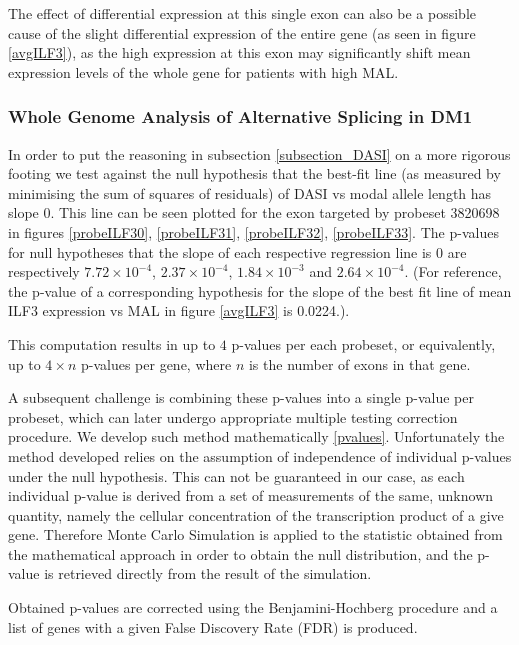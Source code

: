 The effect of differential expression at this single exon can also be a possible cause of the slight differential expression of the entire gene (as seen in figure \ref{avgILF3}), as the high expression at this exon may significantly shift mean expression levels of the whole gene for patients with high MAL.

\subsubsection{Whole Genome Analysis of Alternative Splicing in DM1} \label{section_wholegenome}

In order to put the reasoning in subsection \ref{subsection_DASI} on a more rigorous footing we test against the null hypothesis that the best-fit line (as measured by minimising the sum of squares of residuals) of DASI vs modal allele length has slope 0. This line can be seen plotted for the exon targeted by probeset 3820698 in figures \ref{probeILF30}, \ref{probeILF31}, \ref{probeILF32}, \ref{probeILF33}. The p-values for null hypotheses that the slope of each respective regression line is 0 are respectively $7.72×10^{-4}$, $2.37×10^{-4}$, $1.84 × 10^{-3}$ and $2.64 × 10 ^{-4}$. (For reference, the p-value of a corresponding hypothesis for the slope of the best fit line of mean ILF3 expression vs MAL in figure \ref{avgILF3} is 0.0224.).

This computation results in up to $4$ p-values per each probeset, or equivalently, up to $4×n$ p-values per gene, where $n$ is the number of exons in that gene.

A subsequent challenge is combining these p-values into a single p-value per probeset, which can later undergo appropriate multiple testing correction procedure. We develop such method mathematically \ref{pvalues}. Unfortunately the method developed relies on the assumption of independence of individual p-values under the null hypothesis. This can not be guaranteed in our case, as each individual p-value is derived from a set of measurements of the same, unknown quantity, namely the cellular concentration of the transcription product of a give gene. Therefore Monte Carlo Simulation is applied to the statistic obtained from the mathematical approach in order to obtain the null distribution, and the p-value is retrieved directly from the result of the simulation.

Obtained p-values are corrected using the Benjamini-Hochberg procedure \parencite{Benjamini1995} and a list of genes with a given False Discovery Rate (FDR) is produced.

